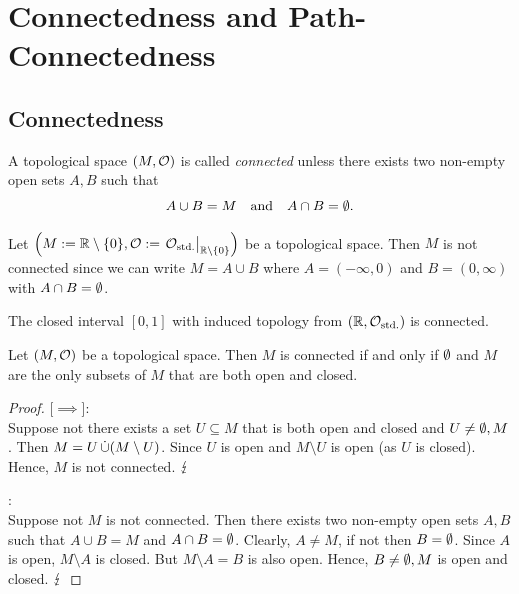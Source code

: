\section{Connectedness and Path-Connectedness}

\subsection{Connectedness}
\begin{definition}\label{def:connected_space}
	A topological space \((M, \mathcal{O})\) is called \emph{connected} unless there exists two non-empty open sets \(A, B\) such that
	\begin{equation}
		A \cup B = M \quad \text{and} \quad A \cap B = \emptyset. \label{eq:connected_space}
	\end{equation}
\end{definition}

\begin{example}
	Let \(\qty(M := \R \setminus \qty{0}, \CO := \eval{\COstd}_{\R \setminus \qty{0}})\) be a topological space. Then \(M\) is not connected since we can write \(M = A \cup B\) where \(A = (-\infty, 0)\) and \(B = (0, \infty)\) with \(A \cap B = \emptyset\).
\end{example}

\begin{theorem}
	The closed interval \([0, 1]\) with induced topology from \((\mathbb R, \mathcal{O}_{\text{std.}})\) is connected.
\end{theorem}

\begin{theorem}
	Let \((M, \mathcal{O})\) be a topological space. Then \(M\) is connected if and only if \(\emptyset\) and \(M\) are the only subsets of \(M\) that are both open and closed.
\end{theorem}

\begin{proof}

	[\(\implies\)]:\\
	Suppose not there exists a set \(U \subseteq M\) that is both open and closed and \(U \neq \emptyset, M\). Then \(M = U \operatorname{\dot{\cup}} (M \setminus U)\). Since \(U\) is open and \(M \setminus U\) is open (as \(U\) is closed). Hence, \(M\) is not connected. \(\operatorname{\lightning}\)

	\noindent [\(\impliedby\)]:\\
	Suppose not \(M\) is not connected. Then there exists two non-empty open sets \(A, B\) such that \(A \cup B = M\) and \(A \cap B = \emptyset\). Clearly, \(A \ne M\), if not then \(B = \emptyset\). Since \(A\) is open, \(M \setminus A\) is closed. But \(M \setminus A = B\) is also open. Hence, \(B \ne \emptyset, M\) is open and closed. \(\operatorname{\lightning}\)
\end{proof}

